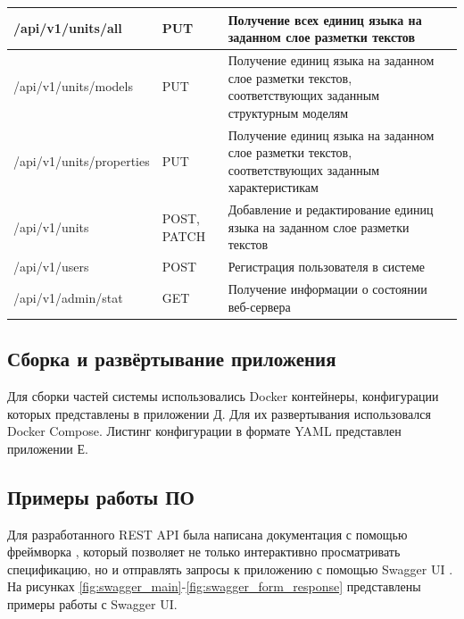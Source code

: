 \begin{landscape}
\begin{longtable}{|p{}|p{}|p{}|}
		/api/v1/units/all    		& PUT 		& Получение всех единиц языка на заданном слое разметки текстов \\\hline
		/api/v1/units/models    	& PUT 		& Получение единиц языка на заданном слое разметки текстов, соответствующих заданным структурным моделям \\\hline
		/api/v1/units/properties    & PUT 		& Получение единиц языка на заданном слое разметки текстов, соответствующих заданным характеристикам \\\hline
		/api/v1/units              	& POST, PATCH& Добавление и редактирование единиц языка на заданном слое разметки текстов\\\hline
		
		/api/v1/users            	& POST 		& Регистрация пользователя в системе \\\hline
		
		/api/v1/admin/stat        	& GET 		& Получение информации о состоянии веб-сервера \\
	\end{longtable}
\end{landscape}

\subsection{Сборка и развёртывание приложения}


Для сборки частей системы использовались Docker контейнеры, конфигурации которых представлены в приложении Д. Для их развертывания использовался Docker Compose. Листинг конфигурации в формате YAML представлен приложении Е.

\subsection{Примеры работы ПО}

Для разработанного REST API была написана документация с помощью фреймворка \cite{Swagger}, который позволяет не только интерактивно просматривать спецификацию, но и отправлять запросы к приложению с помощью Swagger UI \cite{Swagger_UI}. На рисунках \ref{fig:swagger_main}-\ref{fig:swagger_form_response} представлены примеры работы с Swagger UI.

